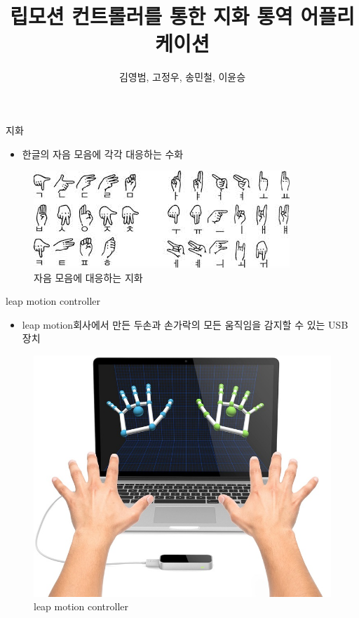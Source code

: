 \documentclass[10pt]{beamer}
\title{립모션 컨트롤러를 통한 지화 통역 어플리케이션}
\author{김영범, 고정우, 송민철, 이윤승}
\begin{document}
\begin{frame}
  \maketitle
\end{frame}

\begin{frame}{지화}
  \begin{itemize}
    \item 한글의 자음 모음에 각각 대응하는 수화
  \end{itemize}
  \begin{figure}[h!]
    \centering
    \includegraphics[scale=0.75]{images.jpg}
    \caption{자음 모음에 대응하는 지화}
  \end{figure}
 
\end{frame}

\begin{frame}{leap motion controller}
  
  \begin{itemize}
    \item leap motion회사에서 만든 두손과 손가락의 모든 움직임을 감지할 수 있는 USB 장치
  \end{itemize}
  \begin{figure}[h!]
    \centering
    \includegraphics[scale=0.25]{2016120621586977.jpg}
    \caption{leap motion controller}
  \end{figure}

\end{frame}
\end{document}
